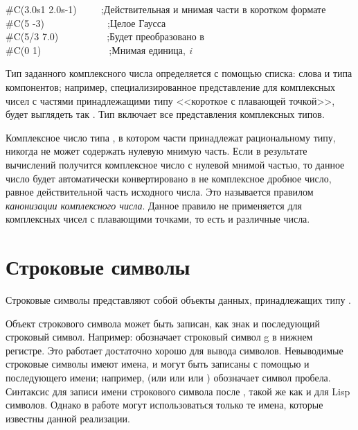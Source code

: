 \begin{lisp}
\#C(3.0s1 2.0s-1)~~~~~;\textrm{Действительная и мнимая части в коротком формате}\\
\#C(5 -3)~~~~~~~~~~~~~;\textrm{Целое Гаусса} \\
\#C(5/3 7.0)~~~~~~~~~~;\textrm{Будет преобразовано в } \\
\#C(0 1)~~~~~~~~~~~~~~;\textrm{Мнимая единица, \emph{i}}
\end{lisp}

Тип заданного комплексного числа определяется с помощью списка: слова
 и типа компонентов; например, специализированное представление для
комплексных чисел с частями принадлежащими типу <<короткое с плавающей точкой>>,
будет выглядеть так . Тип  включает все
представления комплексных типов.

Комплексное число типа , в котором части принадлежат
рациональному типу, никогда не может содержать нулевую мнимую часть. Если в
результате вычислений получится комплексное число с нулевой мнимой частью, то
данное число будет автоматически конвертировано в не комплексное дробное число,
равное действительной часть исходного числа. Это называется правилом
\emph{канонизации комплексного числа}. Данное правило не применяется для
комплексных чисел с плавающими точками, то есть  и  различные
числа.

\section{Строковые символы}

Строковые символы представляют собой объекты данных, принадлежащих типу
.

Объект строкового символа может быть записан, как знак \cd{\#{\Xbackslash}} и
последующий строковый символ. Например:  
обозначает строковый символ g в нижнем регистре. Это работает достаточно хорошо
для вывода символов. Невыводимые строковые символы имеют имена, и могут быть
записаны с помощью \cd{\#{\Xbackslash}} и последующего имени; например,
 (или  или
 или ) обозначает символ пробела.
Синтаксис для записи имени строкового символа после \cd{\#{\Xbackslash}}, такой
же как и для Lisp символов. Однако в работе могут использоваться только те
имена, которые известны данной реализации.

